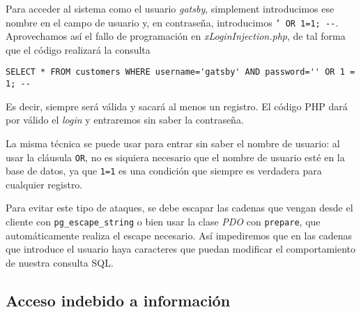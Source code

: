 \documentclass{article}
\begin{document}
Para acceder al sistema como el usuario \textit{gatsby}, simplement introducimos ese nombre en el campo de usuario y, en contraseña, introducimos \texttt{' OR 1=1; {-}-}. Aprovechamos así el fallo de programación en \textit{xLoginInjection.php}, de tal forma que el código realizará la consulta

\begin{center}
\begin{verbatim}
SELECT * FROM customers WHERE username='gatsby' AND password='' OR 1 = 1; --
\end{verbatim}
\end{center}

Es decir, siempre será válida y sacará al menos un registro. El código PHP dará por válido el \textit{login} y entraremos sin saber la contraseña.

La misma técnica se puede usar para entrar sin saber el nombre de usuario: al usar la cláusula \texttt{OR}, no es siquiera necesario que el nombre de usuario esté en la base de datos, ya que \texttt{1=1} es una condición que siempre es verdadera para cualquier registro.

Para evitar este tipo de ataques, se debe escapar las cadenas que vengan desde el cliente con \texttt{pg\_escape\_string} o bien usar la clase \textit{PDO} con \texttt{prepare}, que automáticamente realiza el escape necesario. Así impediremos que en las cadenas que introduce el usuario haya caracteres que puedan modificar el comportamiento de nuestra consulta SQL.

\subsection{Acceso indebido a información}
\end{document}
